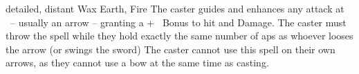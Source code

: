   {detailed, distant}%
  {Wax}%
  {Earth, Fire}%
  {}%
  {The caster guides and enhances any attack at \spellRange\ -- usually an arrow -- granting a +~ Bonus to hit and Damage.
    The caster must throw the spell while they hold exactly the same number of \glspl{ap} as whoever looses the arrow (or swings the sword)}%
  {The caster cannot use this spell on their own arrows, as they cannot use a bow at the same time as casting.}

